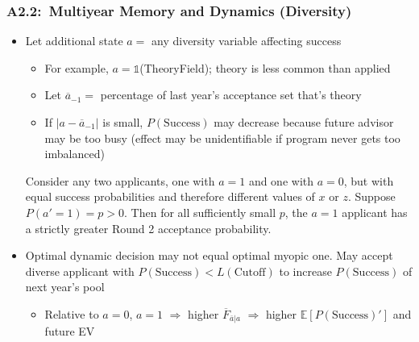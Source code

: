 \documentclass[12pt, aspectratio=169]{beamer}
\begin{document}
\begin{frame}[label=mmdd]
\frametitle{A2.2:\ Multiyear Memory and Dynamics (Diversity)}
\vspace{-3.75pt}
\begin{itemize}
\item Let additional state $a=$ any diversity variable affecting success
\vspace{2.5pt}
\begin{itemize}
\item For example, $a=\mathds{1}$(TheoryField); theory is less common than applied
\vspace{2.5pt}
\item Let $\overline{a}_{-1}=$ percentage of last year's acceptance set that's theory
\vspace{2.5pt}
\item If $|a-\overline{a}_{-1}|$ is small, $P(\text{Success})$ may decrease because future advisor may be too busy (effect may be unidentifiable if program never gets too imbalanced)
\end{itemize}
\begin{theorem}
\small Consider any two applicants, one with $a=1$ and one with $a=0$, but with equal success probabilities and therefore different values of $x$ or $z$. Suppose $P(a'=1)=p>0$. Then for all sufficiently small $p$, the $a=1$ applicant has a strictly greater Round 2 acceptance probability. \normalsize
\end{theorem}
\vspace{2.5pt}
\item Optimal dynamic decision may not equal optimal myopic one. May accept diverse applicant with $P(\text{Success})<L(\text{Cutoff})$ to increase $P(\text{Success})$ of next year's pool
\vspace{2.5pt}
\begin{itemize}
\item Relative to $a=0$, $a=1$ $\Rightarrow$ higher $\overline{F}_{\overline{a}|a}$ $\Rightarrow$ higher $\mathbb{E}[P(\text{Success})']$ and future EV
\end{itemize}
\end{itemize}
\hyperlink{conc}{}
\end{frame}
\end{document}
